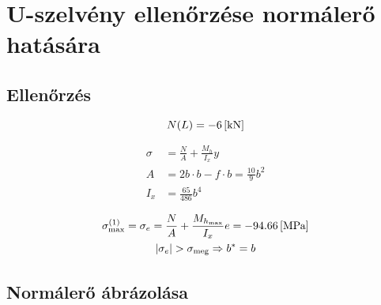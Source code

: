 \section{U-szelvény ellenőrzése normálerő hatására}

\subsection{Ellenőrzés}
\begin{equation*}
	N(L) = \SI{-6}{[\kilo\newton]} 
\end{equation*}

\begin{align*}
	\sigma &= \frac{N}{A} + \frac{M_h}{I_x} y \\
	A &= 2b \cdot b - f \cdot b = \frac{10}{9}b^2 \\
	I_x &= \frac{65}{486} b^4
\end{align*}

\begin{gather*}
	\sigma^{(1)}_\text{max} = \sigma_e 
	= \frac{N}{A} + \frac{M_{h_\text{max}}}{I_x} e 
	= \SI{-94.66}{[\mega\pascal]} \\
	\left|\sigma_e\right| > \sigma_\text{meg} \Rightarrow b^* = b
\end{gather*}

\subsection{Normálerő ábrázolása}
